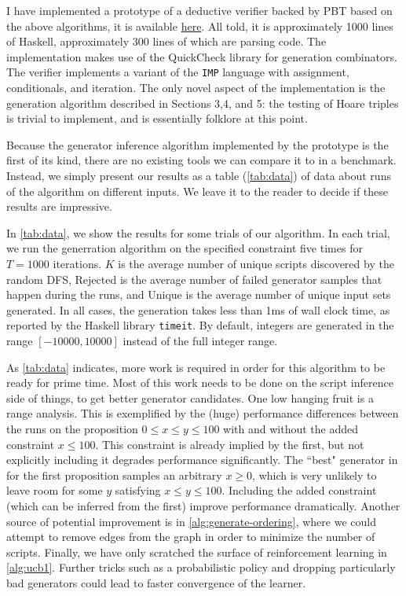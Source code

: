 \documentclass[sigconf,nonacm]{acmart}
\begin{document}
I have implemented a prototype of a deductive verifier backed by PBT based on the above algorithms, it is available \href{https://github.com/jdublu10/triple-testing}{here}. All told, it is approximately 1000 lines of Haskell, approximately 300 lines of which are parsing code. The implementation makes use of the QuickCheck library \cite{qc} for generation combinators. The verifier implements a variant of the \texttt{IMP} language \cite{imp}
with assignment, conditionals, and iteration. The only novel aspect of the implementation is the generation algorithm described in Sections 3,4, and 5: the testing of Hoare triples is trivial to implement, and is essentially folklore at this point.

Because the generator inference algorithm implemented by the prototype is the first of its kind, there are no existing tools we can compare it to in a benchmark. Instead, we simply present our results as a table (\autoref{tab:data}) of data about runs of the algorithm on different inputs. We leave it to the reader to decide if these results are impressive.

In \autoref{tab:data}, we show the results for some trials of our algorithm. In each trial, we run the generration algorithm on the specified constraint five times for $T = 1000$ iterations. $K$ is the average number of unique scripts discovered by the random DFS, Rejected is the average number of failed generator samples that happen during the runs, and Unique is the average number of unique input sets generated. In all cases, the generation takes less than 1ms of wall clock time, as reported by the Haskell library \texttt{timeit}. By default, integers are generated in the range $[-10000,10000]$ instead of the full integer range.

As \autoref{tab:data} indicates, more work is required in order for this algorithm to be ready for prime time. Most of this work needs to be done on the script inference side of things, to get better generator candidates. One low hanging fruit is a range analysis. This is exemplified by the (huge) performance differences between the runs on the proposition $0 \leq x \leq y \leq 100$ with and without the added constraint $x \leq 100$. This constraint is already implied by the first, but not explicitly including it degrades performance significantly. The ``best" generator in for the first proposition samples an arbitrary $x \geq 0$, which is very unlikely to leave room for some $y$ satisfying $x \leq y \leq 100$. Including the added constraint (which can be inferred from the first) improve performance dramatically. Another source of potential improvement is in \autoref{alg:generate-ordering}, where we could attempt to remove edges from the graph in order to minimize the number of scripts. Finally, we have only scratched the surface of reinforcement learning in \autoref{alg:ucb1}. Further tricks such as a probabilistic policy and dropping particularly bad generators could lead to faster convergence of the learner.
\end{document}
